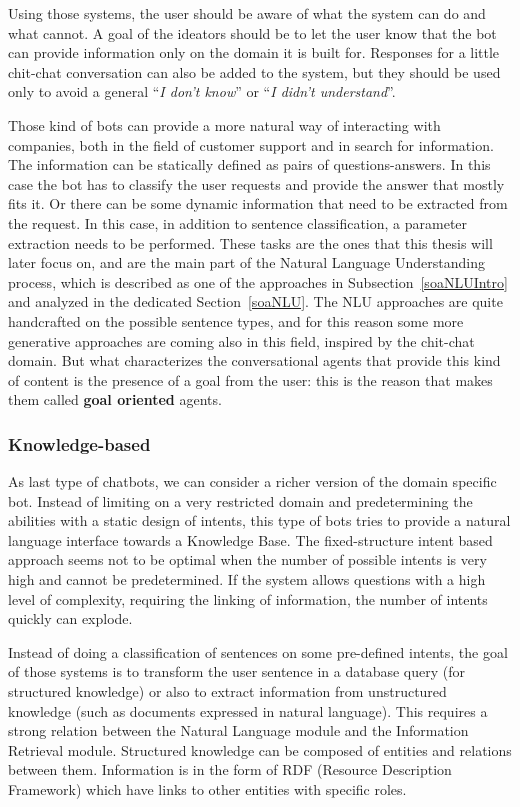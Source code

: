 Using those systems, the user should be aware of what the system can do and what cannot. A goal of the ideators should be to let the user know that the bot can provide information only on the domain it is built for. Responses for a little chit-chat conversation can also be added to the system, but they should be used only to avoid a general ``\textit{I don't know}''  or ``\textit{I didn't understand}''.

Those kind of bots can provide a more natural way of interacting with companies, both in the field of customer support and in search for information. The information can be statically defined as pairs of questions-answers. In this case the bot has to classify the user requests and provide the answer that mostly fits it. Or there can be some dynamic information that need to be extracted from the request. In this case, in addition to sentence classification, a parameter extraction needs to be performed. These tasks are the ones that this thesis will later focus on, and are the main part of the Natural Language Understanding process, which is described as one of the approaches in  Subsection~\ref{soaNLUIntro} and analyzed in the dedicated Section~\ref{soaNLU}. The NLU approaches are quite handcrafted on the possible sentence types, and for this reason some more generative approaches are coming also in this field, inspired by the chit-chat domain. But what characterizes the conversational agents that provide this kind of content is the presence of a goal from the user: this is the reason that makes them called \textbf{goal oriented} agents.

\subsubsection{Knowledge-based}
As last type of chatbots, we can consider a richer version of the domain specific bot. Instead of limiting on a very restricted domain and predetermining the abilities with a static design of intents, this type of bots tries to provide a natural language interface towards a Knowledge Base. The fixed-structure intent based approach seems not to be optimal when the number of possible intents is very high and cannot be predetermined. If the system allows questions with a high level of complexity, requiring the linking of information, the number of intents quickly can explode.

Instead of doing a classification of sentences on some pre-defined intents, the goal of those systems is to transform the user sentence in a database query (for structured knowledge) or also to extract information from unstructured knowledge (such as documents expressed in natural language). This requires a strong relation between the Natural Language module and the Information Retrieval module. Structured knowledge can be composed of entities and relations between them. Information is in the form of RDF (Resource Description Framework) which have links to other entities with specific roles.

